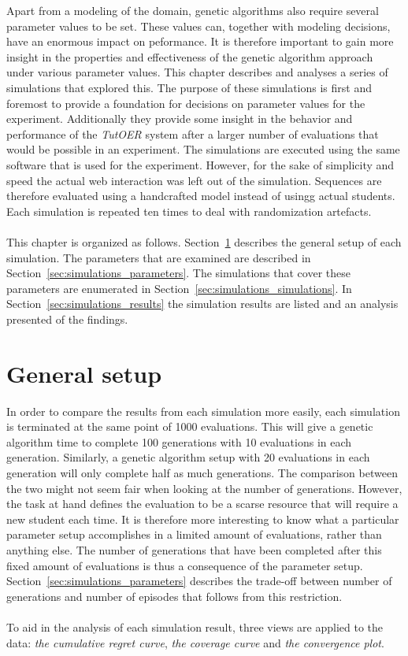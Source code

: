 Apart from a modeling of the domain, genetic algorithms also require several
parameter values to be set. These values can, together with modeling decisions,
have an enormous impact on peformance. It is therefore important to gain more
insight in the properties and effectiveness of the genetic algorithm approach
under various parameter values. This chapter describes and analyses a series of
simulations that explored this. The purpose of these simulations is first and
foremost to provide a foundation for decisions on parameter values for the
experiment. Additionally they provide some insight in the behavior and
performance of the \emph{TutOER} system after a larger number of evaluations
that would be possible in an experiment. The simulations are executed using the
same software that is used for the experiment. However, for the
sake of simplicity and speed the actual web interaction was left out of the
simulation. Sequences are therefore evaluated using a handcrafted model instead
of usingg actual students. Each simulation is repeated ten times to deal with
randomization artefacts.\\\\
\noindent
This chapter is organized as follows. Section~\ref{sec:simulations_setup}
describes the general setup of each simulation.
The parameters that are examined are described in
Section~\ref{sec:simulations_parameters}.  The simulations that cover these
parameters are enumerated in Section~\ref{sec:simulations_simulations}. In
Section~\ref{sec:simulations_results} the simulation results are listed and
an analysis presented of the findings.

\section{General setup}
\label{sec:simulations_setup}
In order to compare the results from each simulation more easily, each
simulation is terminated at the same point of 1000 evaluations. This will give
a genetic algorithm time to complete 100 generations with 10 evaluations in
each generation. Similarly, a genetic algorithm setup with 20 evaluations in
each generation will only complete half as much generations. The comparison
between the two might not seem fair when looking at the number of generations.
However, the task at hand defines the evaluation to be a scarse resource that
will require a new student each time. It is therefore more interesting to know
what a particular parameter setup accomplishes in a limited amount of
evaluations, rather than anything else. The number of generations that have
been completed after this fixed amount of evaluations is thus a consequence of
the parameter setup. Section~\ref{sec:simulations_parameters} describes the
trade-off between number of generations and number of episodes that follows
from this restriction.\\\\
\noindent
To aid in the analysis of each simulation result, three views are applied to
the data: \emph{the cumulative regret curve}, \emph{the coverage curve} and
\emph{the convergence plot}.
